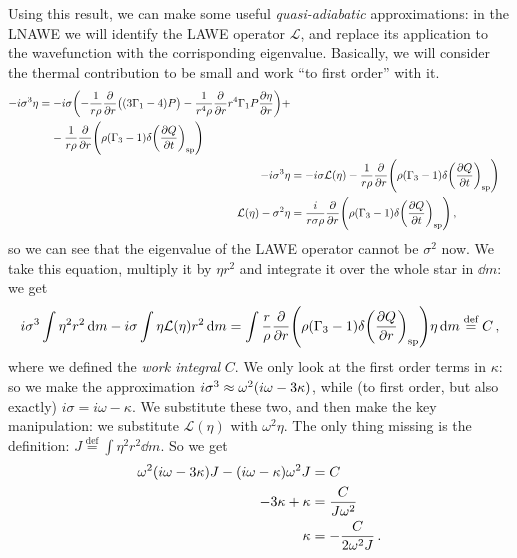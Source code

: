 \documentclass[main.tex]{subfiles}
\begin{document}
Using this result, we can make some useful \emph{quasi-adiabatic} approximations: in the LNAWE we will identify the LAWE operator \(\mathcal{L}\), and replace its application to the wavefunction with the corrisponding eigenvalue. Basically, we will consider the thermal contribution to be small and work ``to first order'' with  it.
%
\begin{align}
\begin{split}
- i \sigma^3 \eta  &= 
-i \sigma \qty(- \frac{1}{r \rho } \pdv{}{r} \qty((3\Gamma_1 -4) P) - \frac{1}{r^{4} \rho } \pdv{}{r} r^{4} \Gamma_1 P \pdv{\eta }{r}) + \\
&\phantom{=}\ 
 - \frac{1}{r \rho } \pdv{}{r} 
\qty(\rho (\Gamma_3 -1) \delta \qty(\pdv{Q}{t})_{\text{sp}})
\end{split} 
\\
- i \sigma^3 \eta &= 
- i \sigma \mathcal{L}(\eta ) 
- \frac{1}{r \rho } \pdv{}{r} 
\qty(\rho (\Gamma_3 -1) \delta \qty(\pdv{Q}{t})_{\text{sp}}) \\
\mathcal{L}(\eta ) - \sigma^2 \eta &= 
\frac{i}{r \sigma  \rho } \pdv{}{r} 
\qty(\rho (\Gamma_3 -1) \delta \qty(\pdv{Q}{t})_{\text{sp}})
\,,
\end{align}
%
so we can see that the eigenvalue of the LAWE operator cannot be \(\sigma^2\) now. We take this equation, multiply it by \(\eta r^2\) and integrate it over the whole star in \(\dd{m}\): we get 
%
\begin{align}
i \sigma^3 \int \eta^2r^2 \dd{m} 
- i \sigma \int \eta \mathcal{L}(\eta) r^2 \dd{m}
= \int \frac{r}{\rho } \pdv{}{r} \qty(\rho (\Gamma_3 -1) \delta \qty(\pdv{Q}{r}) _{\text{sp}}) \eta \dd{m}
\overset{\text{def}}{=} C
\,,
\end{align}
%
where we defined the \emph{work integral} \(C\). 
We only look at the first order terms in \(\kappa \): so we make the approximation \(i \sigma^3 \approx \omega^2 \qty(i \omega - 3 \kappa )\), while (to first order, but also exactly) \(i \sigma = i \omega - \kappa \). We substitute these two, and then make the key manipulation: we substitute \(\mathcal{L}(\eta )\) with \(\omega^2 \eta \). 
The only thing missing is the definition: \(J \overset{\text{def}}{=} \int \eta^2 r^2 \dd{m}\).
So we get 
%
\begin{align}
\omega^2 \qty(i \omega - 3 \kappa ) J 
- (i \omega - \kappa ) \omega^2 J &= C \\
- 3 \kappa + \kappa &= \frac{C}{J \omega^2} \\
\kappa &= - \frac{C}{2 \omega^2 J }
\,.
\end{align}
\end{document}
